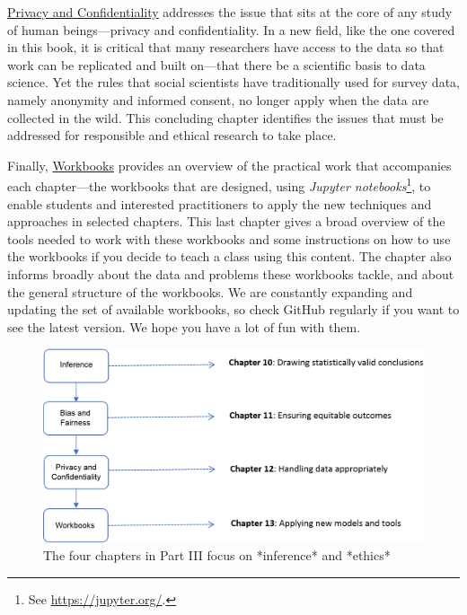 \documentclass[]{krantz}
\begin{document}
\protect\hyperlink{chap:privacy}{Privacy and Confidentiality} addresses
the issue that sits at the core of any study of human beings---privacy
and confidentiality. In a new field, like the one covered in this book,
it is critical that many researchers have access to the data so that
work can be replicated and built on---that there be a scientific basis
to data science. Yet the rules that social scientists have traditionally
used for survey data, namely anonymity and informed consent, no longer
apply when the data are collected in the wild. This concluding chapter
identifies the issues that must be addressed for responsible and ethical
research to take place.

Finally, \protect\hyperlink{chap:workbooks}{Workbooks} provides an
overview of the practical work that accompanies each chapter---the
workbooks that are designed, using \emph{Jupyter notebooks}\footnote{See
  \url{https://jupyter.org/}.}, to enable students and interested
practitioners to apply the new techniques and approaches in selected
chapters. This last chapter gives a broad overview of the tools needed
to work with these workbooks and some instructions on how to use the
workbooks if you decide to teach a class using this content. The chapter
also informs broadly about the data and problems these workbooks tackle,
and about the general structure of the workbooks. We are constantly
expanding and updating the set of available workbooks, so check GitHub
regularly if you want to see the latest version. We hope you have a lot
of fun with them.

\begin{figure}

{\centering \includegraphics[width=0.9\linewidth]{ChapterIntro/figures/Figure4_new} 

}

\caption{The four chapters in Part III focus on *inference* and *ethics*}\label{fig:fig5}
\end{figure}
\end{document}
